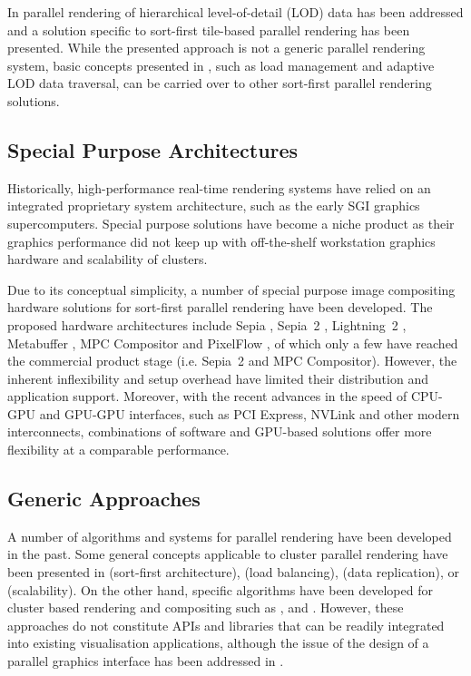 In \cite{NC:07} parallel rendering of hierarchical level-of-detail (LOD) data
has been addressed and a solution specific to sort-first tile-based parallel
rendering has been presented. While the presented approach is not a generic
parallel rendering system, basic concepts presented in \cite{NC:07}, such as load
management and adaptive LOD data traversal, can be carried over to other
sort-first parallel rendering solutions.

\subsection{Special Purpose Architectures}

Historically, high-performance real-time rendering systems have relied on an
integrated proprietary system architecture, such as the early SGI graphics
supercomputers. Special purpose solutions have become a niche product as their
graphics performance did not keep up with off-the-shelf workstation graphics
hardware and scalability of clusters.

Due to its conceptual simplicity, a number of special purpose image compositing
hardware solutions for sort-first parallel rendering have been developed. The
proposed hardware architectures include Sepia \cite {MHS:99a,sepia}, Sepia~2
\cite{LMSBHa:01,LMSBH:01}, Lightning~2 \cite{Stoll01}, Metabuffer
\cite{Blanke00,Zhang01}, MPC Compositor \cite{Muraki01} and PixelFlow
\cite{Molnar92,Eyles97}, of which only a few have reached the commercial
product stage (i.e. Sepia~2 and MPC Compositor). However, the inherent
inflexibility and setup overhead have limited their distribution and
application support. Moreover, with the recent advances in the speed of CPU-GPU
and GPU-GPU interfaces, such as PCI Express, NVLink and other modern
interconnects, combinations of software and GPU-based solutions offer more
flexibility at a comparable performance.

\subsection{Generic Approaches}

A number of algorithms and systems for parallel rendering have been developed in
the past. Some general concepts applicable to cluster parallel
rendering have been presented in \cite{Mueller:95,Mueller:97} (sort-first
architecture), \cite{SZFLS:99,SFLS:00} (load balancing), \cite{SFL:01} (data
replication), or \cite{CMF:05,CM:06} (scalability). On the other hand, specific
algorithms have been developed for cluster based rendering and compositing such
as \cite{AP:98}, \cite{CKS:02} and \cite{YYC:01,SMLAP:03}. However, these
approaches do not constitute APIs and libraries that can be readily integrated
into existing visualisation applications, although the issue of the design of a
parallel graphics interface has been addressed in \cite{Igehy98}.

